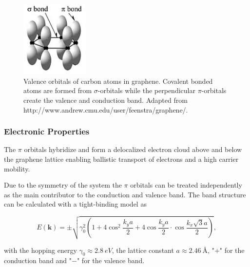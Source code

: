 \begin{figure}[!h]
  \centering
  \includegraphics[width=0.3\textwidth]{./images/orbitals.jpg}
  \caption{Valence orbitals of carbon atoms in graphene. Covalent bonded atoms are formed from $\sigma$-orbitals while the perpendicular $\pi$-orbitals create the valence and conduction band. Adapted from http://www.andrew.cmu.edu/user/feenstra/graphene/\mcite.}
  \label{fig:orbitals}
\end{figure}

\subsubsection{Electronic Properties}

The $\pi$ orbitals hybridize and form a delocalized electron cloud above and below the graphene lattice enabling ballistic transport of electrons and a high carrier mobility\mcite.

Due to the symmetry of the system the $\pi$ orbitals can be treated independently as the main contributor to the conduction and valence band. The band structure can be calculated with a tight-binding model as\mcite

\begin{equation}
  E(\mathbf{k})=\pm\sqrt{\gamma_0^2\left(1+4\cos^2\frac{k_ya}{2}+4\cos\frac{k_ya}{2}\cdot\cos\frac{k_x\sqrt{3}a}{2}\right)},
  \label{eq:dispersion}
\end{equation}

with the hopping energy $\gamma_0\approx\SI{2.8}{eV}$, the lattice constant $a\approx\SI{2.46}{Å}$, "$+$" for the conduction band and "$-$" for the valence band.

